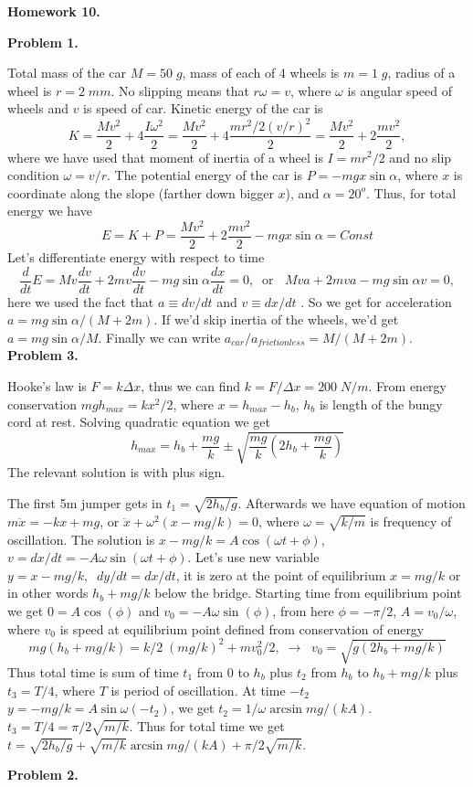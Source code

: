 \documentclass[12pt]{article}
\begin{document}
\begin{center}
{\bf\large Homework 10.}
\end{center}

{\bf Problem 1.}

Total mass of the car $M=50\;g$, mass of each of 4 wheels is  $m=1\;g$, radius of a wheel
is $r=2\;mm$. No slipping means that $r\omega=v$, where $\omega$ is angular speed of
wheels and $v$ is speed of car. Kinetic energy of the car is
$$K=\frac{Mv^2}{2}+4\frac{I\omega^2}{2}=\frac{Mv^2}{2}+4\frac{mr^2/2 (v/r)^2}{2}=\frac{Mv^2}{2}+2\frac{mv^2}{2},$$
where we have used that moment of inertia of a wheel is $I=mr^2/2$ and no slip condition
$\omega=v/r$. The potential energy of the car is $P=-mgx\sin\alpha$, where $x$ is coordinate
along the slope (farther down bigger $x$), and $\alpha =20^o$. Thus, for total energy
we have
$$E=K+P=\frac{Mv^2}{2}+2\frac{mv^2}{2}-mgx\sin\alpha=Const$$
Let's differentiate energy with respect to time
$$\frac{d}{dt}E=Mv\frac{dv}{dt}+2mv\frac{dv}{dt}-mg\sin\alpha\frac{dx}{dt}=0,\;\;\mbox{or }\;\;Mv a+2mv a-mg\sin\alpha v=0,$$ 
here we used the fact that $a\equiv dv/dt$ and $v\equiv dx/dt$ . So we get for acceleration
$a=mg\sin\alpha/(M+2m)$. If we'd skip inertia of the wheels, we'd get $a=mg\sin\alpha/M$.
Finally we can write  $a_{car}/a_{frictionless}=M/(M+2m)$.
\\

{\bf Problem 3.}

Hooke's law is $F=k\Delta x$, thus we can find $k=F/\Delta x=200\;N/m$.
From energy conservation $mgh_{max}=k x^2/2$, where $ x=h_{max}-h_{b}$, $h_b$ is
length of the bungy cord at rest. Solving quadratic equation we get
$$h_{max}=h_b+\frac{mg}{k}\pm\sqrt{\frac{mg}{k}\left(2 h_b+\frac{mg}{k}\right)}$$
The relevant solution is with plus sign.

The first 5m jumper gets in $t_1=\sqrt{2h_b/g}$.
Afterwards we have equation of motion $m\ddot{x}=-kx+mg$, or $\ddot{x}+\omega^2 (x-mg/k)=0$,
where $\omega=\sqrt{k/m}$ is frequency of oscillation. The solution is
$x-mg/k=A\cos(\omega t +\phi)$, $v=dx/dt=-A\omega\sin(\omega t +\phi)$.
Let's use new variable $y=x-mg/k,\;\;dy/dt=dx/dt$, it is zero at the point  of equilibrium $x=mg/k$
or in other words $h_b+mg/k$ below the bridge.
Starting time from equilibrium point we get $0=A\cos(\phi)$ and $v_0=-A\omega\sin(\phi)$, 
from here $\phi=-\pi/2$, $A=v_0/\omega$, where $v_0$ is speed at equilibrium point defined from
conservation of energy $$mg(h_b+mg/k)=k/2\;(mg/k)^2 +mv_0^2/2,\;\rightarrow\;\;v_0=\sqrt{g(2h_b+mg/k)}$$
Thus total time is sum of time $t_1$ from $0$ to $h_b$ plus $t_2$ from $h_b$ to $h_b+mg/k$ plus $t_3=T/4$, where $T$ is  period of oscillation.
At time  $-t_2$ $y=-mg/k=A\sin\omega(- t_2)$, we get $t_2=1/\omega \arcsin mg/(kA)$.
$t_3=T/4=\pi/2 \sqrt{m/k}$. Thus for total time we get $t=\sqrt{2h_b/g}+ \sqrt{m/k} \arcsin mg/(kA) +\pi/2 \sqrt{m/k}$.

{\bf Problem 2.}

\begin{figure}[h]
\begin{center}
\end{center}
\end{figure}
\end{document}
